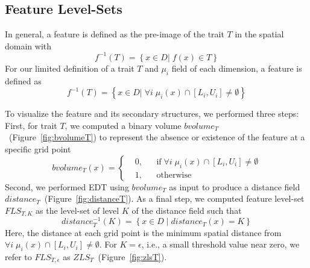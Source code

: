 \vspace{-2mm}
\subsection{Feature Level-Sets}
\label{sec:fls}
In general, a feature is defined as the pre-image of the trait $T$ in the spatial domain with
\begin{equation}
f^{-1}(T) = \left\{ x \in D |\; f(x) \in T \right\}
\end{equation}
%
For our limited definition of a trait $T$ and ${\mu}_{i}$ field of each dimension, a feature is defined as 
\begin{equation}
f^{-1}(T) = \left\{ x \in D |\; \forall i\;{\mu}_{i}(x) \cap [L_{i}, U_{i}] \neq \emptyset\right\}
\end{equation}





To visualize the feature and its secondary structures, we performed three steps:
%
First, for trait $T$, we computed a binary volume $bvolume_{T}$~(Figure~\ref{fig:bvolumeT}) to represent the absence or existence of the feature at a specific grid point 
%
\begin{equation}
  bvolume_{T}(x) = \left \{
  \begin{aligned}
    &0, && \text{if}\; \forall i\; {\mu}_{i}(x) \cap [L_{i}, U_{i}] \neq \emptyset \\
    &1, && \text{otherwise}
  \end{aligned} \right.
\end{equation}
%
Second, we performed EDT using $bvolume_{T}$ as input to produce a distance field $distance_{T}$~(Figure~\ref{fig:distanceT}). 
%
%
As a final step, we computed feature level-set $FLS_{T,K}$ as the level-set of level $K$ of the distance field such that
%
\begin{equation} 
distance_{T}^{-1}(K) = \left\{ x \in D\; |\; distance_{T}(x) = K\right\}
\end{equation}
%
Here, the distance at each grid point is the minimum spatial distance from $\forall i\; \mu_{i}(x) \cap [L_{i}, U_{i}] \neq \emptyset$.
%
For $K = \epsilon$, i.e., a small threshold value near zero, we refer to $FLS_{T,\epsilon}$ as $ZLS_{T}$~(Figure~\ref{fig:zlsT}).
%
%

